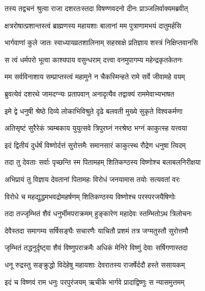 \twolineshloka
{तस्य तद्वचनं श्रुत्वा राजा दशरतःस्तदा}
{विषण्णवदनो दीनः प्राञ्जलिर्वाक्यमब्रवीत्} %

\twolineshloka
{क्षत्ररोषात्प्रशान्तस्त्वं ब्राह्मणस्य महायशाः}
{बालानां मम पुत्राणामभयं दातुमर्हसि} %

\twolineshloka
{भार्गवाणां कुले जातः स्वाध्यायव्रतशालिनाम्}
{सहस्राक्षे प्रतिज्ञाय शस्त्रं निक्षिप्तवानसि} %

\twolineshloka
{स त्वं धर्मपरो भूत्वा काश्यपाय वसुन्धराम्}
{दत्त्वा वनमुपागम्य महेन्द्रकृतकेतनः} %

\twolineshloka
{मम सर्वविनाशाय सम्प्राप्तस्त्वं महामुने}
{न चैकस्मिन्हते रामे सर्वे जीवामहे वयम्} %

\twolineshloka
{ब्रुवत्येवं दशरथे जामदग्न्यः प्रतापवान्}
{अनादृत्यैव तद्वाक्यं राममेवाभ्यभाषत} %

\twolineshloka
{इमे द्वे धनुषी श्रेष्ठे दिव्ये लोकाभिविश्रुते}
{दृढे बलवती मुख्ये सुकृते विश्वकर्मणा} %

\twolineshloka
{अतिसृष्टं सुरैरेकं त्र्यम्बकाय युयुत्सवे}
{त्रिपुरघ्नं नरश्रेष्ठ भग्नं काकुत्स्ह यत्त्वया} %

\twolineshloka
{इदं द्वितीयं दुर्धर्षं विष्णोर्दत्तं सुरोत्तमैः}
{समानसारं काकुत्स्थ रौद्रेण धनुषा त्विदम्} %

\twolineshloka
{तदा तु देवताः सर्वाः पृच्छन्ति स्म पितामहम्}
{शितिकण्ठस्य विष्णोश्च बलाबलनिरीक्षया} %

\twolineshloka
{अभिप्रायं तु विज्ञाय देवतानां पितामहः}
{विरोधं जनयामास तयोः सत्यवतां वरः} %

\twolineshloka
{विरोधे च महद्युद्धमभवद्रोमहर्षणम्}
{शितिकण्ठस्य विष्णोश्च परस्परजयैषिणोः} %

\twolineshloka
{तदा तज्जृम्भितं शैवं धनुर्भीमपराक्रमम्}
{हुङ्कारेण महादेवः स्तम्भितोऽथ त्रिलोचनः} %

\twolineshloka
{देवैस्तदा समागम्य सर्षिसङ्घैः सचारणैः}
{याचितौ प्रशमं तत्र जग्मतुस्तौ सुरोत्तमौ} %

\twolineshloka
{जृम्भितं तद्धनुर्दृष्ट्वा शैवं विष्णुपराक्रमैः}
{अधिकं मेनिरे विष्णुं देवाः सर्षिगणास्तदा} %

\twolineshloka
{धनू रुद्रस्तु सङ्क्रुद्धो विदेहेषु महायशाः}
{देवरातस्य राजर्षेर्ददौ हस्ते ससायकम्} %

\twolineshloka
{इदं च विष्णवं राम धनुः परपुरंजयम्}
{ऋचीके भार्गवे प्रादाद्विष्णुः स न्यासमुत्तमम्} %

